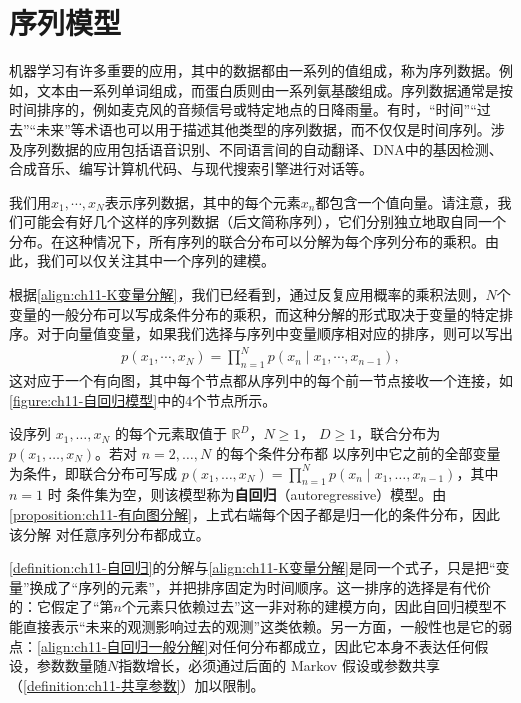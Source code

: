 \documentclass[../../main.tex]{subfiles}
\begin{document}
\section{序列模型}\label{section:ch11-序列模型}

机器学习有许多重要的应用，其中的数据都由一系列的值组成，称为序列数据。例如，文本由一系列单词组成，而蛋白质则由一系列氨基酸组成。序列数据通常是按时间排序的，例如麦克风的音频信号或特定地点的日降雨量。有时，“时间”“过去”“未来”等术语也可以用于描述其他类型的序列数据，而不仅仅是时间序列。涉及序列数据的应用包括语音识别、不同语言间的自动翻译、DNA中的基因检测、合成音乐、编写计算机代码、与现代搜索引擎进行对话等。

我们用$x_1,\cdots,x_N$表示序列数据，其中的每个元素$x_n$都包含一个值向量。请注意，我们可能会有好几个这样的序列数据（后文简称序列），它们分别独立地取自同一个分布。在这种情况下，所有序列的联合分布可以分解为每个序列分布的乘积。由此，我们可以仅关注其中一个序列的建模。

根据\eqref{align:ch11-K变量分解}，我们已经看到，通过反复应用概率的乘积法则，$N$个变量的一般分布可以写成条件分布的乘积，而这种分解的形式取决于变量的特定排序。对于向量值变量，如果我们选择与序列中变量顺序相对应的排序，则可以写出
\begin{align}
  p(x_1,\cdots,x_N) = \prod_{n=1}^{N}p(x_n\mid x_1,\cdots,x_{n-1}),
  \label{align:ch11-自回归一般分解}
\end{align}
这对应于一个有向图，其中每个节点都从序列中的每个前一节点接收一个连接，如\cref{figure:ch11-自回归模型}中的4个节点所示。

\begin{definition}[自回归模型]\label{definition:ch11-自回归}
设序列 $x_1,\dots,x_N$ 的每个元素取值于 $\mathbb{R}^{D}$，$N\geqslant1$，
$D\geqslant1$，联合分布为 $p(x_1,\dots,x_N)$。若对 $n=2,\dots,N$ 的每个条件分布都
以序列中它之前的全部变量为条件，即联合分布可写成
$p(x_1,\dots,x_N)=\prod_{n=1}^{N}p(x_n\mid x_1,\dots,x_{n-1})$，其中 $n=1$ 时
条件集为空，则该模型称为\textbf{自回归}（autoregressive）模型。由
\cref{proposition:ch11-有向图分解}，上式右端每个因子都是归一化的条件分布，因此该分解
对任意序列分布都成立。
\end{definition}

\begin{remark}
\cref{definition:ch11-自回归}的分解与\eqref{align:ch11-K变量分解}是同一个式子，只是把“变量”换成了“序列的元素”，并把排序固定为时间顺序。这一排序的选择是有代价的：它假定了“第$n$个元素只依赖过去”这一非对称的建模方向，因此自回归模型不能直接表示“未来的观测影响过去的观测”这类依赖。另一方面，一般性也是它的弱点：\eqref{align:ch11-自回归一般分解}对任何分布都成立，因此它本身不表达任何假设，参数数量随$N$指数增长，必须通过后面的 Markov 假设或参数共享（\cref{definition:ch11-共享参数}）加以限制。
\end{remark}
\end{document}
